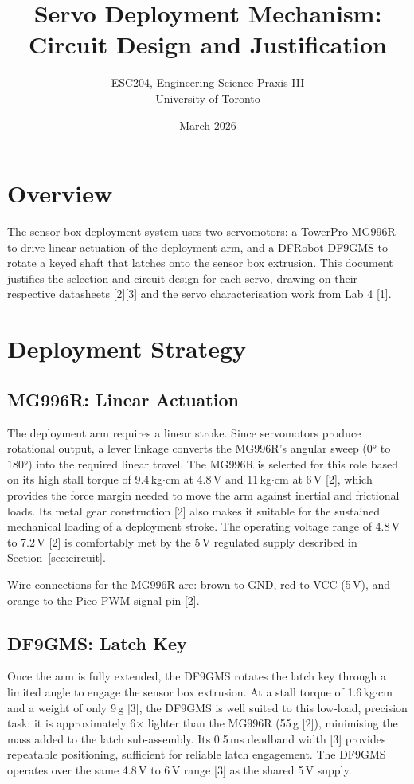 \documentclass[12pt, letterpaper]{article}
\title{\textbf{Servo Deployment Mechanism:\\Circuit Design and Justification}}
\author{ESC204, Engineering Science Praxis III \\ University of Toronto}
\date{March 2026}
\begin{document}
\maketitle
\tableofcontents
\newpage

\section{Overview}

The sensor-box deployment system uses two servomotors: a TowerPro MG996R to drive linear
actuation of the deployment arm, and a DFRobot DF9GMS to rotate a keyed shaft that latches
onto the sensor box extrusion. This document justifies the selection and circuit design for
each servo, drawing on their respective datasheets [2][3] and the servo characterisation
work from Lab 4 [1].

\section{Deployment Strategy}

\subsection{MG996R: Linear Actuation}

The deployment arm requires a linear stroke. Since servomotors produce rotational output, a
lever linkage converts the MG996R's angular sweep ($0°$ to $180°$) into the required linear
travel. The MG996R is selected for this role based on its high stall torque of 9.4\,kg$\cdot$cm
at 4.8\,V and 11\,kg$\cdot$cm at 6\,V [2], which provides the force margin needed to move
the arm against inertial and frictional loads. Its metal gear construction [2] also makes it
suitable for the sustained mechanical loading of a deployment stroke. The operating voltage
range of 4.8\,V to 7.2\,V [2] is comfortably met by the 5\,V regulated supply described in
Section~\ref{sec:circuit}.

Wire connections for the MG996R are: brown to GND, red to VCC (5\,V), and orange to the
Pico PWM signal pin [2].

\subsection{DF9GMS: Latch Key}

Once the arm is fully extended, the DF9GMS rotates the latch key through a limited angle to
engage the sensor box extrusion. At a stall torque of 1.6\,kg$\cdot$cm and a weight of
only 9\,g [3], the DF9GMS is well suited to this low-load, precision task: it is
approximately 6$\times$ lighter than the MG996R (55\,g [2]), minimising the mass added to
the latch sub-assembly. Its 0.5\,ms deadband width [3] provides repeatable positioning,
sufficient for reliable latch engagement. The DF9GMS operates over the same 4.8\,V to 6\,V
range [3] as the shared 5\,V supply.
\end{document}

